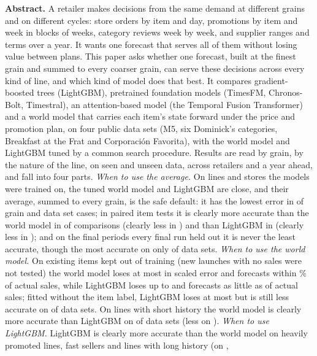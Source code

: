 \small
\textbf{Abstract.}
A retailer makes decisions from the same demand at different grains and on
different cycles: store orders by item and day, promotions by item and week in
blocks of weeks, category reviews week by week, and supplier ranges and terms
over a year. It wants one forecast that serves all of them without losing value
between plans. This paper asks whether one forecast, built at the finest grain
and summed to every coarser grain, can serve these decisions across every kind
of line, and which kind of model does that best. It compares gradient-boosted
trees (LightGBM), pretrained foundation models (TimesFM, Chronos-Bolt,
Timestral), an attention-based model (the Temporal Fusion Transformer) and a
world model that carries each item's state forward under the price and
promotion plan, on four public data sets (M5, six Dominick's categories,
Breakfast at the Frat and Corporaci\'on Favorita), with the world model and
LightGBM tuned by a common search procedure. Results are read by grain, by the nature of
the line, on seen and unseen data, across retailers and a year ahead, and fall into four parts.
\emph{When to use the average.} On lines and stores the models were trained on, the tuned world
model and LightGBM are close, and their average, summed to every grain, is the safe default: it
has the lowest error in \rqAvgBestCells{} of \rqCells{} grain and data set cases; in paired item tests
it is clearly more accurate than the world model in \rqPAvgWmBetter{} of \rqPAvgWmN{} comparisons
(clearly less in \rqPAvgWmWorse{}) and than LightGBM in \rqPAvgLgbBetter{} (clearly less in
\rqPAvgLgbWorse{}); and on the final periods every final run held out it is never the least
accurate, though the most accurate on only \hoAvgBest{} of \hoSets{} data sets.
\emph{When to use the world model.} On existing items kept out of training (new launches with no sales were not
tested) the world model loses at most
\rqCostWmItemHi{} in scaled error and forecasts within \rqWmFaItemOff\% of actual sales, while
LightGBM loses up to \rqCostLgbItemHi{} and forecasts as little as \rqLgbFaItemLoFrac{} of actual
sales; fitted without the item label, LightGBM loses at most \rqNoidCostHi{} but is still less
accurate on \rqWmBeatsNoid{} of \rqNoidSets{} data sets. On lines with short history the world model
is clearly more accurate than LightGBM on \kWmBetterShortHistory{} of \rqNineWord{} data sets
(less on \kWmWorseShortHistory{}).
\emph{When to use LightGBM.} LightGBM is clearly more accurate than the world model on heavily
promoted lines, fast sellers and lines with long history (on \kWmWorseHeavyPromotion{},
